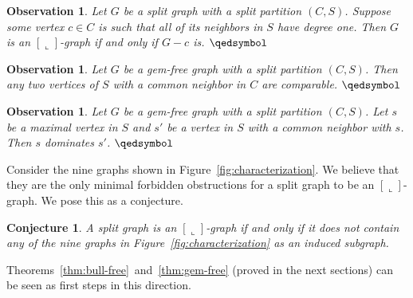 \documentclass[11pt,3p,times]{elsarticle}
\newcommand{\La}{\ensuremath{\llcorner}} \newcommand{\Lb}{\ensuremath{\ulcorner}} \newcommand{\Lc}{\ensuremath{\lrcorner}} \newcommand{\Ld}{\ensuremath{\urcorner}}
\newcommand{\proofBox}{\hfill $\qedsymbol$}
\newtheorem{observation}[theorem]{Observation}
\newtheorem{conjecture}{Conjecture}
\begin{document}
\begin{observation}\label{obs:neighbor-degree-one}
Let $G$ be a split graph  with a split partition $(C,S)$. Suppose
some vertex $c \in C$ is such that all of its neighbors in $S$
have degree one. Then $G$ is an $[\La]$-graph if and only if $G-c$ is. \proofBox
\end{observation}
\begin{observation}\label{obs:gem-comparable}
Let $G$ be a gem-free graph with a split partition $(C,S)$. Then
any two vertices of $S$ with a common neighbor in $C$ are
comparable. \proofBox
\end{observation}
\begin{observation}\label{obs:gem-domination}
Let $G$ be a gem-free graph with a split partition $(C,S)$. Let
$s$ be a maximal vertex in $S$ and $s'$ be a vertex in $S$ with a
common neighbor with $s$. Then $s$ dominates $s'$. 
\proofBox
\end{observation}

Consider the nine graphs shown in
Figure~\ref{fig:characterization}. We believe that they are the
only minimal forbidden obstructions for a split graph to be an
$[\La]$-graph. We pose this as a conjecture.

\begin{conjecture}
A split graph is an $[\La]$-graph if and only if it does not contain any of
the nine graphs in Figure~\ref{fig:characterization} as an induced
subgraph.
\end{conjecture}
Theorems~\ref{thm:bull-free}~and~\ref{thm:gem-free} (proved in the
next sections) can be seen as first steps in this direction.
\end{document}
